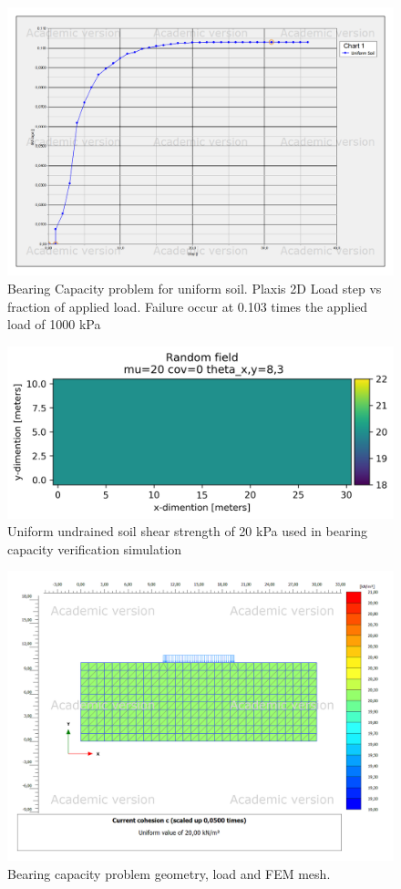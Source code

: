 \begin{figure}[h]
	\includegraphics[width=\textwidth]{fig/bc/Chart2}
	\caption{Bearing Capacity problem for uniform soil. Plaxis 2D Load step vs fraction of applied load. Failure occur at 0.103 times the applied load of 1000 kPa}
	\label{fig:bc_su4}
\end{figure}
\begin{figure}[h]
	\includegraphics[width=\textwidth]{fig/bc/test20211116-100048}
	\caption{Uniform undrained soil shear strength of 20 kPa used in bearing capacity verification simulation}
	\label{fig:bc_su1}
\end{figure}
\begin{figure}[h]
	\includegraphics[width=\textwidth]{fig/bc/testp20211116-100145}
	\caption{Bearing capacity problem geometry, load and FEM mesh.}
	\label{fig:bc_su2}
\end{figure}
